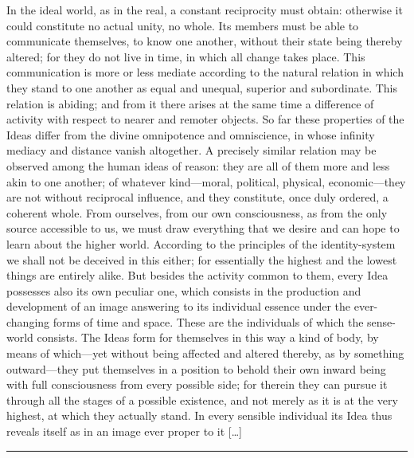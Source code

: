 \documentclass[12pt,a4paper]{article}
\begin{document}
\noindent
[\dots] In the ideal world, as in the real, a constant reciprocity must obtain:
otherwise it could constitute no actual unity, no whole. Its members must be able
to communicate themselves, to know one another, without their state being thereby
altered; for they do not live in time, in which all change takes place. This
communication is more or less mediate according to the natural relation in which
they stand to one another as equal and unequal, superior and subordinate. This
relation is abiding; and from it there arises at the same time a difference of
activity with respect to nearer and remoter objects. So far these properties of the
Ideas differ from the divine omnipotence
and omniscience, in whose infinity mediacy and distance vanish altogether. A
precisely similar relation may be observed among the human ideas of reason: they
are all of them more and less akin to one another; of whatever kind---moral,
political, physical, economic---they are not without reciprocal influence, and
they constitute, once duly ordered, a coherent whole. From ourselves, from our own
consciousness, as from the only source accessible to us, we must draw everything
that we desire and can hope to learn about the higher world. According to the
principles of the identity-system we shall not be deceived in this either; for
essentially the highest and the lowest things are entirely alike. But besides the
activity common to them, every Idea possesses also its own peculiar one, which
consists in the production and development of an image answering to its individual
essence under the ever-changing forms of time and space. These are the individuals
of which the sense-world consists. The Ideas form for themselves in this way a kind
of body, by means of which---yet without being affected and altered thereby, as by
something outward---they put themselves in a position to behold their own inward
being with full consciousness from every possible side; for therein they can pursue
it through all the stages of a possible existence, and not merely as it is at the
very highest, at which they actually stand. In every sensible individual its Idea
thus reveals itself as in an image ever proper to it [\dots]

\begin{center}\rule{0.25\linewidth}{0.4pt}\end{center}
\end{document}

